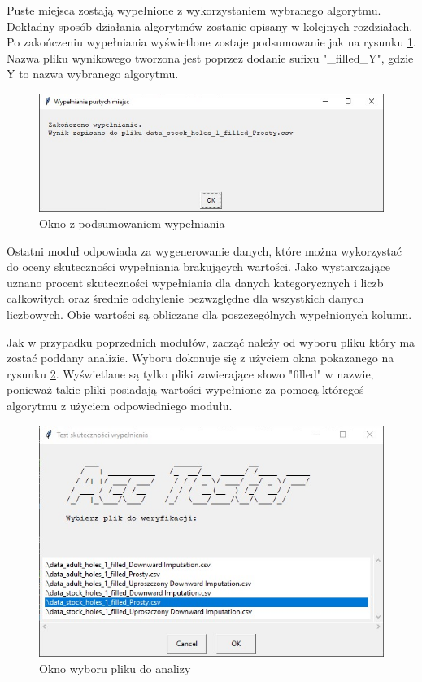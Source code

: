 \documentclass[12pt,twoside]{article}
\begin{document}
Puste miejsca zostają wypełnione z wykorzystaniem wybranego algorytmu.
Dokładny sposób działania algorytmów zostanie opisany w kolejnych rozdziałach.
Po zakończeniu wypełniania wyświetlone zostaje podsumowanie jak na rysunku \ref{Fig:fill_end}.
Nazwa pliku wynikowego tworzona jest poprzez dodanie sufixu "\_filled\_Y", gdzie Y to nazwa wybranego algorytmu.

\begin{figure}[ht]
	\centering
	\includegraphics[width=12cm]{img/07.jpg}
	\caption{Okno z podsumowaniem wypełniania}
\label{Fig:fill_end}
\end{figure}
\FloatBarrier


Ostatni moduł odpowiada za wygenerowanie danych,
które można wykorzystać do oceny skuteczności wypełniania brakujących wartości.
Jako wystarczające uznano procent skuteczności wypełniania dla danych kategorycznych i liczb całkowitych
oraz średnie odchylenie bezwzględne dla wszystkich danych liczbowych.
Obie wartości są obliczane dla poszczególnych wypełnionych kolumn.

Jak w przypadku poprzednich modułów, zacząć należy od wyboru pliku który ma zostać poddany analizie.
Wyboru dokonuje się z użyciem okna pokazanego na rysunku \ref{Fig:acc_file}.
Wyświetlane są tylko pliki zawierające słowo "filled" w nazwie, ponieważ takie pliki
posiadają wartości wypełnione za pomocą któregoś algorytmu z użyciem odpowiedniego modułu.

\begin{figure}[ht]
	\centering
	\includegraphics[width=12cm]{img/08.jpg}
	\caption{Okno wyboru pliku do analizy}
\label{Fig:acc_file}
\end{figure}
\FloatBarrier
\end{document}
